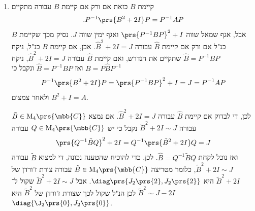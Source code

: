 \documentclass[a4paper,10pt,twoside,openany]{book}
\renewcommand{\Mat}{\mathrm{M}}
\begin{document}
\begin{solution}
\begin{enumerate}
נותר למצוא
$P$
הפיכה עבורה
$P^{-1} A P = J$.
לשם כך נמצא בסיס ז'ורדן של
$T_A$.
ראינו כי
$\ker\prs{A - 2I} = \Span\prs{e_1, e_2}$
וכי
$\ker\prs{\prs{A - 2I}^2} = \Span\prs{e_1, e_2, e_3, e_4}$.
ניקח בסיס שמורכב משרשראות ז'ורדן שנפתחות ע"י הוקטורים שהוספנו לבסיס של הגרעין. כלומר,
\[\text{.} B = \prs{\prs{A - 2I} e_3, e_3, \prs{A - 2I} e_4, e_4} = \prs{\pmat{1 \\ 10 \\ 0 \\ 0}, \pmat{0 \\ 0 \\ 1 \\ 0}, \pmat{-3 \\ 4 \\ 0 \\ 0}, \pmat{0 \\ 0 \\0 \\ 1}}\]
אז
$B$
בסיס ז'ורדן של
$T_A$
ולכן
\[P = M^B_E = \pmat{1 & 0 & -3 & 0 \\ 10 & 0 & 4 & 0 \\ 0 & 1 & 0 & 0 \\ 0 & 0 & 0 & 1}\]
עונה על הנדרש, שכן
\begin{align*}
\text{.} P^{-1} A P = M^E_B \brs{T_A}_E M^B_E = \brs{T_A}_B = J
\end{align*}

\item

קיימת
$B$
כזאת אם ורק אם קיימת
$B$
עבורה מתקיים
\begin{align*}
\text{.} P^{-1} \prs{B^2 + 2 I} P = P^{-1} A P
\end{align*}
אבל, אגף שמאל שווה
$\prs{P^{-1} B P}^2 + I$
ואגף ימין
שווה
$J$.
נסיק מכך שקיימת
$B$
כנ"ל אם ורק אם קיימת
$\hat{B}$
עבורה
$\hat{B}^2 + 2 I = J$.
אכן,
אם קיימת
$B$
כנ"ל, ניקח
$\hat{B} = P^{-1} B P$
שתקיים את הנדרש, ואם קיימת
$\hat{B}$
עבורה
$\hat{B}^2 + 2 I = J$,
ניקח
$B = P \hat{B} P^{-1}$
ואז
$\hat{B} = P^{-1} B P$
ונקבל כי
\begin{align*}
P^{-1} \prs{B^2 + 2 I} P = \prs{P^{-1} B P}^2 + I = J = P^{-1} A P
\end{align*}
ולאחר צמצום
$B^2 + I = A$.

לכן, די לבדוק אם קיימת
$\hat{B}$
עבורה
$\hat{B}^2 + 2 I = J$.
אם נמצא
$\tilde{B} \in \Mat_4\prs{\mbb{C}}$
עבורה
$\tilde{B}^2 + 2I \sim J$
נקבל כי יש
$Q \in \Mat_4\prs{\mbb{C}}$
עבורה
\[\prs{Q^{-1} \tilde{B} Q}^2 + 2I = Q^{-1} \prs{\tilde{B}^2 + 2I} Q = J\]
ואז נוכל לקחת
$\hat{B} = Q^{-1} \tilde{B} Q$.
לכן, כדי להוכיח שהטענה נכונה, די למצוא
$\tilde{B}$
עבורה
$\tilde{B}^2 + 2I \sim J$,
כלומר מטריצה
$\tilde{B} \in \Mat_4\prs{\mbb{C}}$
עבורה צורת ז'ורדן של
$\tilde{B}^2 + 2I$
היא
$\diag\prs{J_2\prs{2}, J_2\prs{2}}$.
אבל
$\tilde{B}^2 + 2I \sim J$
שקול ל־%
$\tilde{B}^2 \sim J - 2I$
לכן הנ"ל שקול לכך שצורת ז'ורדן של
$\tilde{B}^2$
היא
$\diag{\J_2\prs{0}, J_2\prs{0}}$.


\end{enumerate}
\end{solution}
\end{document}
